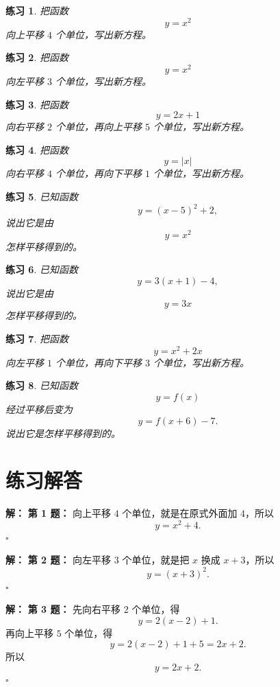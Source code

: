 \documentclass[11pt,a4paper,fontset=fandol]{ctexart}
\theoremstyle{formaltheorem}
\theoremstyle{formalexample}
\newtheorem{exercise}{练习}[section]
\newenvironment{solution}{\par\noindent\textbf{解：}}{\hfill$\square$\par}
\begin{document}
\begin{exercise}
把函数
\[
y=x^2
\]
向上平移 $4$ 个单位，写出新方程。
\end{exercise}

\begin{exercise}
把函数
\[
y=x^2
\]
向左平移 $3$ 个单位，写出新方程。
\end{exercise}

\begin{exercise}
把函数
\[
y=2x+1
\]
向右平移 $2$ 个单位，再向上平移 $5$ 个单位，写出新方程。
\end{exercise}

\begin{exercise}
把函数
\[
y=|x|
\]
向右平移 $4$ 个单位，再向下平移 $1$ 个单位，写出新方程。
\end{exercise}

\begin{exercise}
已知函数
\[
y=(x-5)^2+2,
\]
说出它是由
\[
y=x^2
\]
怎样平移得到的。
\end{exercise}

\begin{exercise}
已知函数
\[
y=3(x+1)-4,
\]
说出它是由
\[
y=3x
\]
怎样平移得到的。
\end{exercise}

\begin{exercise}
把函数
\[
y=x^2+2x
\]
向左平移 $1$ 个单位，再向下平移 $3$ 个单位，写出新方程。
\end{exercise}

\begin{exercise}
已知函数
\[
y=f(x)
\]
经过平移后变为
\[
y=f(x+6)-7.
\]
说出它是怎样平移得到的。
\end{exercise}

\section{练习解答}

\begin{solution}
\textbf{第 1 题：}
向上平移 $4$ 个单位，就是在原式外面加 $4$，所以
\[
\boxed{y=x^2+4}.
\]
\end{solution}

\begin{solution}
\textbf{第 2 题：}
向左平移 $3$ 个单位，就是把 $x$ 换成 $x+3$，所以
\[
\boxed{y=(x+3)^2}.
\]
\end{solution}

\begin{solution}
\textbf{第 3 题：}
先向右平移 $2$ 个单位，得
\[
y=2(x-2)+1.
\]
再向上平移 $5$ 个单位，得
\[
y=2(x-2)+1+5=2x+2.
\]
所以
\[
\boxed{y=2x+2}.
\]
\end{solution}
\end{document}
